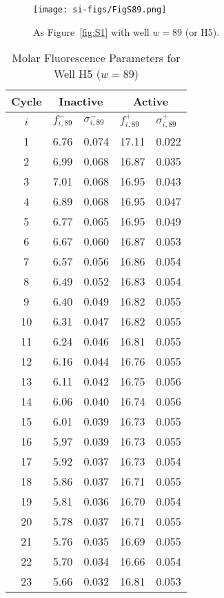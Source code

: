                 \begin{figure}
                    \centering
                    \texttt{[image: si-figs/FigS89.png]}
                    \caption{
                        As Figure~\ref{fig:S1} with well $w=89$ (or H5).
                    }
                \end{figure}
                \clearpage
    \begin{table}
        \caption{Molar Fluorescence Parameters for Well H5 ($w=89$)}
        \centering
        \begin{tabular}{c|ll|ll}
            Cycle & \multicolumn{2}{c|}{Inactive} & \multicolumn{2}{c}{Active} \\
            \hline
            $i$ & $f_{i,89}^{-}$ & $\sigma_{i,89}^{-}$ &  $f_{i,89}^{+}$ & $\sigma_{i,89}^{+}$ \\
            \hline
    1 & 6.76 & 0.074 & 17.11 & 0.022 \\
2 & 6.99 & 0.068 & 16.87 & 0.035 \\
3 & 7.01 & 0.068 & 16.95 & 0.043 \\
4 & 6.89 & 0.068 & 16.95 & 0.047 \\
5 & 6.77 & 0.065 & 16.95 & 0.049 \\
6 & 6.67 & 0.060 & 16.87 & 0.053 \\
7 & 6.57 & 0.056 & 16.86 & 0.054 \\
8 & 6.49 & 0.052 & 16.83 & 0.054 \\
9 & 6.40 & 0.049 & 16.82 & 0.055 \\
10 & 6.31 & 0.047 & 16.82 & 0.055 \\
11 & 6.24 & 0.046 & 16.81 & 0.055 \\
12 & 6.16 & 0.044 & 16.76 & 0.055 \\
13 & 6.11 & 0.042 & 16.75 & 0.056 \\
14 & 6.06 & 0.040 & 16.74 & 0.056 \\
15 & 6.01 & 0.039 & 16.73 & 0.055 \\
16 & 5.97 & 0.039 & 16.73 & 0.055 \\
17 & 5.92 & 0.037 & 16.73 & 0.054 \\
18 & 5.86 & 0.037 & 16.71 & 0.055 \\
19 & 5.81 & 0.036 & 16.70 & 0.054 \\
20 & 5.78 & 0.037 & 16.71 & 0.055 \\
21 & 5.76 & 0.035 & 16.69 & 0.055 \\
22 & 5.70 & 0.034 & 16.66 & 0.054 \\
23 & 5.66 & 0.032 & 16.81 & 0.053 \\

\end{tabular}
\end{table}
